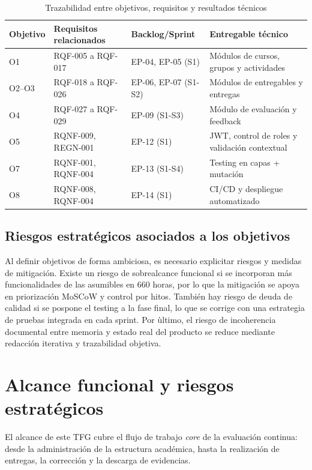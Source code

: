 \begin{table}[!htbp]
\centering
\begin{tabular}{|P{1.9cm}|P{3.2cm}|P{3.6cm}|P{3.7cm}|}
\hline
\textbf{Objetivo} & \textbf{Requisitos relacionados} & \textbf{Backlog/Sprint} & \textbf{Entregable t\'ecnico} \\
\hline
O1 & RQF-005 a RQF-017 & EP-04, EP-05 (S1) & M\'odulos de cursos, grupos y actividades \\
\hline
O2--O3 & RQF-018 a RQF-026 & EP-06, EP-07 (S1-S2) & M\'odulos de entregables y entregas \\
\hline
O4 & RQF-027 a RQF-029 & EP-09 (S1-S3) & M\'odulo de evaluaci\'on y feedback \\
\hline
O5 & RQNF-009, REGN-001 & EP-12 (S1) & JWT, control de roles y validaci\'on contextual \\
\hline
O7 & RQNF-001, RQNF-004 & EP-13 (S1-S4) & Testing en capas + mutaci\'on \\
\hline
O8 & RQNF-008, RQNF-004 & EP-14 (S1) & CI/CD y despliegue automatizado \\
\hline
\end{tabular}
\caption{Trazabilidad entre objetivos, requisitos y resultados t\'ecnicos}
\label{tab:trazabilidad-objetivos}
\end{table}

\subsection{Riesgos estrat\'egicos asociados a los objetivos}

Al definir objetivos de forma ambiciosa, es necesario explicitar riesgos y medidas de mitigaci\'on. Existe un riesgo de sobrealcance funcional si se incorporan m\'as funcionalidades de las asumibles en 660 horas, por lo que la mitigaci\'on se apoya en priorizaci\'on MoSCoW y control por hitos. Tambi\'en hay riesgo de deuda de calidad si se pospone el testing a la fase final, lo que se corrige con una estrategia de pruebas integrada en cada sprint. Por \`ultimo, el riesgo de incoherencia documental entre memoria y estado real del producto se reduce mediante redacci\'on iterativa y trazabilidad objetiva.



\FloatBarrier
\section{Alcance funcional y riesgos estrat\'egicos}

El alcance de este TFG cubre el flujo de trabajo \emph{core} de la evaluaci\'on continua: desde la administraci\'on de la estructura acad\'emica, hasta la realizaci\'on de entregas, la correcci\'on y la descarga de evidencias.


